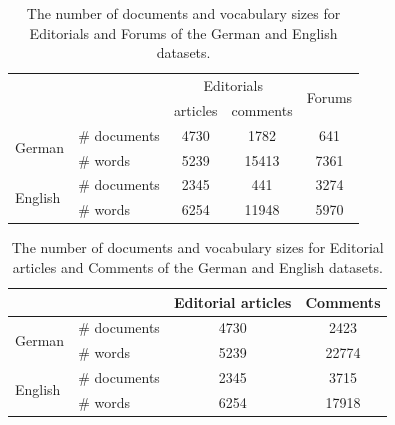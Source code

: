  	\begin{table}[h]
	\begin{tabular}{llccc}
		\cmidrule{3-5}
		&	& \multicolumn{2}{c}{Editorials} & \multirow{2}{*}{Forums} \\
		\cmidrule(r){3-4}
		&	 & articles & comments &  \\
		\midrule
		\multirow{2}{*}{German} &	 \# documents & 4730	& 1782	& 641	\\
		&	\# words & 5239	& 15413	& 7361	\\
		\midrule
		\multirow{2}{*}{English} &	 \# documents & 2345	& 441	& 3274	\\
		&	\# words & 6254	& 11948	& 5970	\\
		\bottomrule
	\end{tabular}
	\caption[Number of documents and vocabulary size for Editorials and Forums]{The number of documents and vocabulary sizes for Editorials and Forums of the German and English datasets.}
	\label{tab:editorial_forum}
	\end{table}

	\begin{table}[h]
		\begin{tabular}{llcc}
			\cmidrule{3-4}
			&	& Editorial articles & Comments \\
			\midrule
			\multirow{2}{*}{German} &	 \# documents & 4730	& 2423	\\
			&	\# words & 5239	& 22774	\\
			\midrule
			\multirow{2}{*}{English} &	 \# documents & 2345	& 3715	\\
			&	\# words & 6254	& 17918	\\
			\bottomrule
		\end{tabular}
		\caption[Number of documents and vocabulary size for Editorial articles and Comments]{The number of documents and vocabulary sizes for Editorial articles and Comments of the German and English datasets.}
		\label{tab:editoria_comments}
	\end{table}

